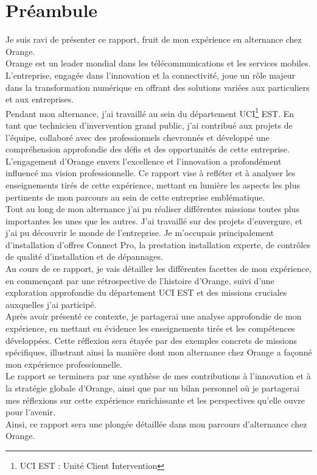 \documentclass[12pt, a4paper]{article}
\begin{document}
\section{Préambule}
Je suis ravi de présenter ce rapport, fruit de mon expérience en alternance chez Orange.\\

Orange est un leader mondial dans les télécommunications et les services mobiles.
L'entreprise, engagée dans l'innovation et la connectivité, joue un rôle majeur dans la
transformation numérique en offrant des solutions variées aux particuliers et aux entreprises.\\

Pendant mon alternance, j'ai travaillé au sein du département UCI\footnote{\vspace{-1cm}UCI EST : Unité Client Intervention} EST.
En tant que technicien d'invervention grand public, j'ai contribué aux projets de l'équipe, collaboré avec des
professionnels chevronnés et développé une compréhension approfondie des défis et des opportunités
de cette entreprise.\\

L'engagement d'Orange envers l'excellence et l'innovation a profondément influencé ma vision
professionnelle. Ce rapport vise à refléter et à analyser les enseignements tirés de cette
expérience, mettant en lumière les aspects les plus pertinents de mon parcours au sein de
cette entreprise emblématique.\\

Tout au long de mon alternance j'ai pu réaliser différentes missions
toutes plus importantes les unes que les autres. J'ai travaillé sur des projets
d'envergure, et j'ai pu découvrir le monde de l'entreprise.
Je m'occupais principalement d'installation d'offres
Connect Pro, la prestation installation experte, 
de contrôles de qualité d'installation et de dépannages.\\


Au cours de ce rapport, je vais détailler les différentes facettes de mon expérience,
en commençant par une rétrospective de l'histoire d'Orange, suivi d'une exploration
approfondie du département UCI EST et des missions cruciales auxquelles
j'ai participé.\\
Après avoir présenté ce contexte, je partagerai une analyse approfondie
de mon expérience, en mettant en évidence les enseignements tirés et
les compétences développées. Cette réflexion sera étayée par des exemples
concrets de missions spécifiques, illustrant ainsi la manière dont mon
alternance chez Orange a façonné mon expérience professionnelle.\\
Le rapport se terminera par une synthèse de mes contributions à
l'innovation et à la stratégie globale d'Orange, ainsi que par un
bilan personnel où je partagerai mes réflexions sur cette expérience
enrichissante et les perspectives qu'elle ouvre pour l'avenir.\\
Ainsi, ce rapport sera une plongée détaillée dans mon parcours
d'alternance chez Orange.
\end{document}
